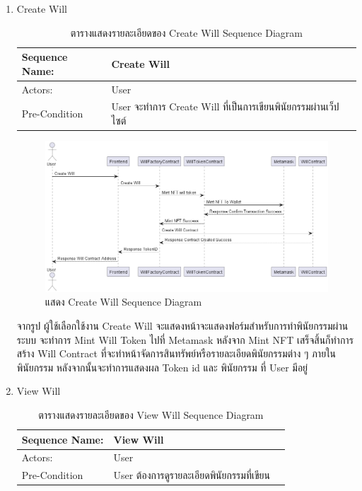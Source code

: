 \documentclass[12pt,oneside,openright,a4paper]{cpe-thai-project}
\begin{document}
\begin{enumerate}[label=\thesubsection.\arabic*,leftmargin=0pt,itemindent=1.25cm]
\clearpage
	\item Create Will
		\begin{table}[h]
		\centering
		\caption{ตารางแสดงรายละเอียดของ Create Will Sequence Diagram}
		\begin{tabularx}{\textwidth}{|l|X|X|} 
			\hline
			Sequence Name: & Create Will                                                    \\ 
			\hline
			Actors:        & User                                                           \\ 
			\hline
			Pre-Condition  & User จะทำการ Create Will ที่เป็นการเขียนพินัยกรรมผ่านเว็ปไซต์  \\
			\hline
		\end{tabularx}
		\end{table}
		\begin{figure}[!thb]
			\centering
			\includegraphics[scale=0.45]{createWillseq}
			\caption{แสดง Create Will Sequence Diagram}
		\end{figure}
		\FloatBarrier
	\tab จากรูป ผู้ใช้เลือกใช้งาน Create Will จะแสดงหน้าจะแสดงฟอร์มสำหรับการทำพินัยกรรมผ่านระบบ จะทำการ Mint Will Token ไปที่ Metamask หลังจาก Mint NFT เสร็จสิ้นก็ทำการสร้าง Will Contract ที่จะทำหน้าจัดการสินทรัพย์หรือรายละเอียดพินัยกรรมต่าง ๆ ภายในพินัยกรรม หลังจากนั้นจะทำการแสดงผล Token id และ พินัยกรรม ที่ User มีอยู่ 
\clearpage
\item View Will
	\begin{table}[h]
	\centering
	\caption{ตารางแสดงรายละเอียดของ View Will Sequence Diagram}
\begin{tabularx}{\textwidth}{|l|X|X|} 
		\hline
		Sequence Name: & View Will                                  \\ 
		\hline
		Actors:        & User                                       \\ 
		\hline
		Pre-Condition  & User ต้องการดูรายละเอียดพินัยกรรมที่เขียน  \\

\end{tabularx}
\end{table}
\end{enumerate}
\end{document}
